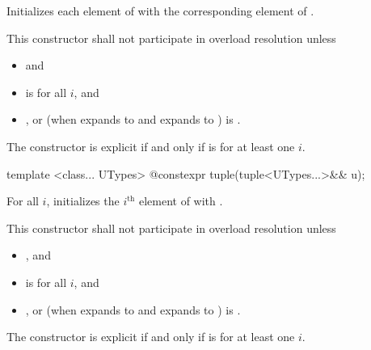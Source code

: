 \begin{itemdescr}
\pnum
\effects Initializes each element of 
with the corresponding element of .

\pnum
\remarks This constructor shall not participate in overload resolution unless
\begin{itemize}
\item
{} \tcode{==}  and
\item
{} is  for all $i$, and
\item
{}, or
(when  expands to  and  expands to )\linebreak
{}
is .
\end{itemize}
The constructor is explicit if and only if
 is 
for at least one $i$.
\end{itemdescr}

%
\begin{itemdecl}
template <class... UTypes> @\EXPLICIT@ constexpr tuple(tuple<UTypes...>&& u);
\end{itemdecl}

\begin{itemdescr}
\pnum
\effects For all $i$,
initializes the $i^\text{th}$ element of  with
.

\pnum
\remarks This constructor shall not participate in overload resolution unless

\begin{itemize}
\item
{} \tcode{==} , and
\item
{} is  for all $i$, and
\item
{}, or
(when  expands to  and  expands to )\linebreak
{}
is .
\end{itemize}
The constructor is explicit if and only if
 is 
for at least one $i$.
\end{itemdescr}

